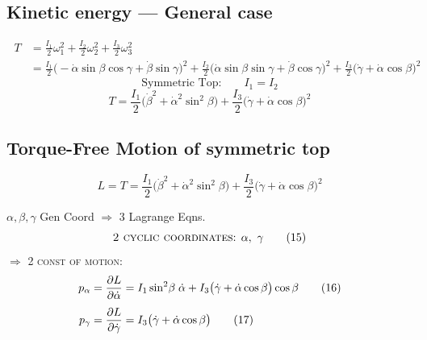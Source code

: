 \documentclass[11pt]{article}
\begin{document}
\subsection*{Kinetic energy --- General case}

\begin{equation*}
\boxed{\;
\begin{aligned}
T &= \frac{I_1}{2}\omega_1^{2} + \frac{I_2}{2}\omega_2^{2} + \frac{I_3}{2}\omega_3^{2}\\
&= \frac{I_1}{2}\bigl(-\dot{\alpha}\sin\beta\cos\gamma + \dot{\beta}\sin\gamma\bigr)^{2}
+ \frac{I_2}{2}\bigl(\dot{\alpha}\sin\beta\sin\gamma + \dot{\beta}\cos\gamma\bigr)^{2}
+ \frac{I_3}{2}\bigl(\dot{\gamma}+\dot{\alpha}\cos\beta\bigr)^{2}
\end{aligned}\;}
\tag{11}\label{eq:B11}
\end{equation*}
\begin{equation*}
\text{Symmetric Top:}\qquad I_1 = I_2 \tag{12}\label{eq:B12}
\end{equation*}
\begin{equation*}
\boxed{\;
T = \frac{I_1}{2}\bigl(\dot{\beta}^{2} + \dot{\alpha}^{2}\sin^{2}\beta\bigr)
+ \frac{I_3}{2}\bigl(\dot{\gamma}+\dot{\alpha}\cos\beta\bigr)^{2}\;}
\tag{13}\label{eq:B13}
\end{equation*}

\subsection*{Torque-Free Motion of symmetric top}

\begin{equation*}
\boxed{\;
L = T = \frac{I_1}{2}\bigl(\dot{\beta}^{2} + \dot{\alpha}^{2}\sin^{2}\beta\bigr)
+ \frac{I_3}{2}\bigl(\dot{\gamma}+\dot{\alpha}\cos\beta\bigr)^{2}\;}
\tag{14}\label{eq:B14}
\end{equation*}

$\alpha,\beta,\gamma$ Gen Coord $\Longrightarrow$ 3 Lagrange Eqns.
\begin{equation*}
\text{\textsc{2 cyclic coordinates}: } \alpha,\ \gamma \tag{15}\label{eq:B15}
\end{equation*}
$\Longrightarrow$ 2 \textsc{const of motion}:
\begin{align*}
p_\alpha &= \frac{\partial L}{\partial \dot{\alpha}}
= I_1 \sin^{2}\!\beta\;\dot{\alpha} + I_3\bigl(\dot{\gamma}+\dot{\alpha}\cos\beta\bigr)\cos\beta
\tag{16}\label{eq:B16}\\[4pt]
p_\gamma &= \frac{\partial L}{\partial \dot{\gamma}} = I_3\bigl(\dot{\gamma}+\dot{\alpha}\cos\beta\bigr)
\tag{17}\label{eq:B17}
\end{align*}
\end{document}
